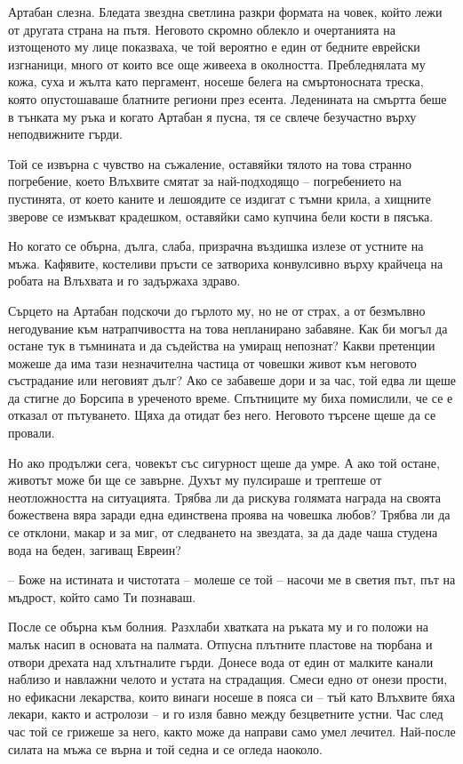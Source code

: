 Артабан слезна. Бледата звездна светлина разкри формата на човек, който лежи от
другата страна на пътя. Неговото скромно облекло и очертанията на изтощеното му
лице показваха, че той вероятно е един от бедните еврейски изгнаници, много от
които все още живееха в околността. Пребледнялата му кожа, суха и жълта като
пергамент, носеше белега на смъртоносната треска, която опустошаваше блатните
региони през есента. Леденината на смъртта беше в тънката му ръка и когато
Артабан я пусна, тя се свлече безучастно върху неподвижните гърди.

Той се извърна с чувство на съжаление, оставяйки тялото на това странно
погребение, което Влъхвите смятат за най-подходящо -- погребението на пустинята,
от което каните и лешоядите се издигат с тъмни крила, а хищните зверове се
измъкват крадешком, оставяйки само купчина бели кости в пясъка.

Но когато се обърна, дълга, слаба, призрачна въздишка излезе от устните на мъжа.
Кафявите, костеливи пръсти се затвориха конвулсивно върху крайчеца на робата на
Влъхвата и го задържаха здраво.

Сърцето на Артабан подскочи до гърлото му, но не от страх, а от безмълвно
негодувание към натрапчивостта на това непланирано забавяне. Как би могъл да
остане тук в тъмнината и да съдейства на умиращ непознат? Какви претенции можеше
да има тази незначителна частица от човешки живот към неговото състрадание или
неговият дълг? Ако се забавеше дори и за час, той едва ли щеше да стигне до
Борсипа в уреченото време. Спътниците му биха помислили, че се е отказал от
пътуването. Щяха да отидат без него. Неговото търсене щеше да се провали.

Но ако продължи сега, човекът със сигурност щеше да умре. А ако той остане,
животът може би ще се завърне. Духът му пулсираше и трептеше от неотложността на
ситуацията. Трябва ли да рискува голямата награда на своята божествена вяра
заради една единствена проява на човешка любов? Трябва ли да се отклони, макар и
за миг, от следването на звездата, за да даде чаша студена вода на беден,
загиващ Евреин?

-- Боже на истината и чистотата -- молеше се той -- насочи ме в светия път, път
на мъдрост, който само Ти познаваш.

После се обърна към болния. Разхлаби хватката на ръката му и го положи на малък
насип в основата на палмата. Отпусна плътните пластове на тюрбана и отвори
дрехата над хлътналите гърди. Донесе вода от един от малките канали наблизо и
навлажни челото и устата на страдащия. Смеси едно от онези прости, но ефикасни
лекарства, които винаги носеше в пояса си -- тъй като Влъхвите бяха лекари,
както и астролози -- и го изля бавно между безцветните устни. Час след час той
се грижеше за него, както може да направи само умел лечител. Най-после силата на
мъжа се върна и той седна и се огледа наоколо.

